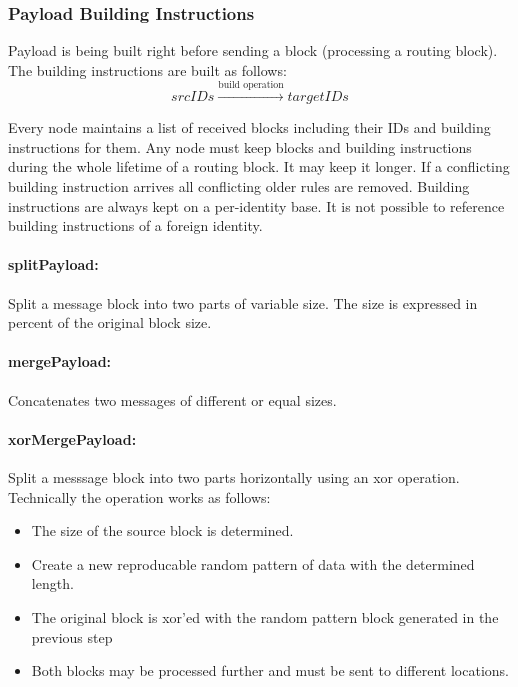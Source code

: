\subsubsection{Payload Building Instructions\label{sec:buildInstr}}
Payload is being built right before sending a block (processing a routing block). The building instructions are built as follows:
\begin{equation*}
srcIDs \xrightarrow{\text{build operation}} targetIDs
\end{equation*}

Every node maintains a list of received blocks including their IDs and building instructions for them. Any node must keep blocks and building instructions during the whole lifetime of a routing block. It may keep it longer. If a conflicting building instruction arrives all conflicting older rules are removed. Building instructions are always kept on a per-identity base. It is not possible to reference building instructions of a foreign identity.

\paragraph{splitPayload:} Split a message block into two parts of variable size. The size is expressed in percent of the original block size.

\paragraph{mergePayload:} Concatenates two messages of different or equal sizes.

\paragraph{xorMergePayload:} Split a messsage block into two parts horizontally using an xor operation. Technically the operation works as follows:
\begin{itemize}
	\item The size of the source block is determined.
	\item Create a new reproducable random pattern of data with the determined length.
	\item The original block is xor'ed with the random pattern block generated in the previous step
	\item Both blocks may be processed further and must be sent to different locations.
\end{itemize}

